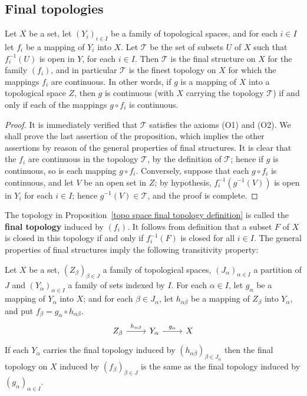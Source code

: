 \subsection{Final topologies}
\begin{proposition}\label{topo space final topology definition}
Let $X$ be a set, let $(Y_i)_{i\in I}$ be a family of topological spaces, and for each $i\in I$ let $f_i$ be a mapping of $Y_i$ into $X$. Let $\mathcal{T}$ be the set of subsets $U$ of $X$ such that $f_i^{-1}(U)$ is open in $Y$, for each $i\in I$. Then $\mathcal{T}$ is the final structure on $X$ for the family $(f_i)$, and in particular $\mathcal{T}$ is the finest topology on $X$ for which the mappings $f_i$ are continuous. In other words, if $g$ is a mapping of $X$ into a topological space $Z$, then $g$ is continuous (with $X$ carrying the topology $\mathcal{T}$) if and only if each of the mappings $g\circ f_i$ is continuous.
\end{proposition}
\begin{proof}
It is immediately verified that $\mathcal{T}$ satisfies the axioms (O1) and (O2). We shall prove the last assertion of the proposition, which implies the other assertions by reason of the general properties of final structures. It is clear that the $f_i$ are continuous in the topology $\mathcal{T}$, by the definition of $\mathcal{T}$; hence if $g$ is continuous, so is each mapping $g\circ f_i$. Conversely, suppose that each $g\circ f_i$ is continuous, and let $V$ be an open set in $Z$; by hypothesis, $f_i^{-1}(g^{-1}(V))$ is open in $Y_i$ for each $i\in I$; hence $g^{-1}(V)\in\mathcal{T}$, and the proof is complete.
\end{proof}
The topology in Proposition~\ref{topo space final topology definition} is called the \textbf{final topology} induced by $(f_i)$. It follows from definition that a subset $F$ of $X$ is closed in this topology if and only if $f_i^{-1}(F)$ is closed for all $i\in I$. The general properties of final structures imply the following transitivity property:
\begin{proposition}
Let $X$ be a set, $(Z_\beta)_{\beta\in J}$ a family of topological spaces, $(J_\alpha)_{\alpha\in I}$ a partition of $J$ and $(Y_\alpha)_{\alpha\in I}$ a family of sets indexed by $I$. For each $\alpha\in I$, let $g_\alpha$ be a mapping of $Y_\alpha$ into $X$; and for each $\beta\in J_\alpha$, let $h_{\alpha\beta}$ be a mapping of $Z_\beta$ into $Y_\alpha$, and put $f_\beta=g_\alpha\circ h_{\alpha\beta}$. 
\[\begin{tikzcd}
Z_\beta\ar[r,"h_{\alpha\beta}"]&Y_\alpha\ar[r,"g_\alpha"]&X
\end{tikzcd}\]
If each $Y_\alpha$ carries the final topology induced by $(h_{\alpha\beta})_{\beta\in J_\alpha}$ then the final topology on $X$ induced by $(f_\beta)_{\beta\in J}$ is the same as the final topology induced by $(g_\alpha)_{\alpha\in I}$.
\end{proposition}
